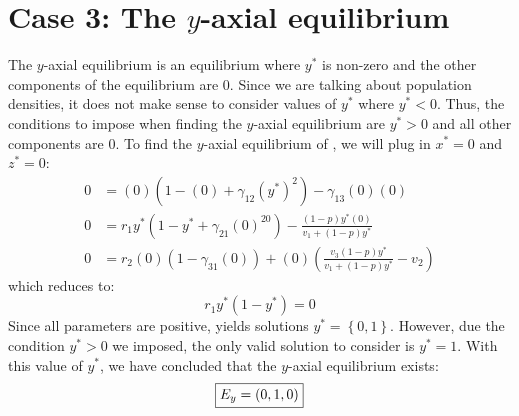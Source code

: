 \section{Case 3: The $y$-axial equilibrium}\label{sec:y_axial_equilibrium}
The $y$-axial equilibrium is an equilibrium where $y^*$ is non-zero and the other components of the equilibrium are 0. Since we are talking about population densities, it does not make sense to consider values of $y^*$ where $y^*<0$. Thus, the conditions to impose when finding the $y$-axial equilibrium are $y^*>0$ and all other components are 0. To find the $y$-axial equilibrium of , we will plug in $x^*=0$ and $z^*=0$:
\begin{align*}
    0 &= (0)\left(1-(0)+\gamma_{12}\left(y^*\right)^2\right)-\gamma_{13}(0)(0)\\
    0 &= r_1y^*\left(1-y^*+\gamma_{21}(0)^20\right)-\frac{\left(1-p\right)y^*(0)}{v_1+\left(1-p\right)y^*}\\
    0 &= r_2(0)\left(1-\gamma_{31}(0)\right)+(0)\left(\frac{v_3\left(1-p\right)y^*}{v_1+\left(1-p\right)y^*}-v_2\right)
\end{align*}
which reduces to:
\begin{equation}
    r_1y^*\left(1-y^*\right)=0
    \label{eq:4.3}
\end{equation}
Since all parameters are positive,  yields solutions $y^*=\left\{0, 1\right\}$. However, due the condition $y^*>0$ we imposed, the only valid solution to consider is $y^*=1$. With this value of $y^*$, we have concluded that the $y$-axial equilibrium exists:
\[
\fbox{$\displaystyle E_y=\left(
0,
1,
0
\right)$}
\]

